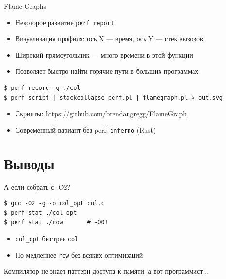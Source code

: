 \documentclass[aspectratio=169, russian]{beamer}
\begin{document}
\begin{frame}[fragile]{Flame Graphs}
    \begin{itemize}
        \item Некоторое развитие \texttt{perf report}
        \item Визуализация профиля: ось X --- время, ось Y --- стек вызовов
        \item Широкий прямоугольник --- много времени в этой функции
        \item Позволяет быстро найти горячие пути в больших программах
    \end{itemize}

    \bigskip
    \begin{verbatim}
$ perf record -g ./col
$ perf script | stackcollapse-perf.pl | flamegraph.pl > out.svg
\end{verbatim}

    \bigskip
    \begin{itemize}
        \item Скрипты: \url{https://github.com/brendangregg/FlameGraph}
        \item Современный вариант без perl: \texttt{inferno} (Rust)
    \end{itemize}
\end{frame}

\section{Выводы}

\begin{frame}[fragile]{А если собрать с -O2?}
    \begin{verbatim}
$ gcc -O2 -g -o col_opt col.c
$ perf stat ./col_opt
$ perf stat ./row       # -O0!
\end{verbatim}

    \bigskip
    \begin{itemize}
        \item \texttt{col\_opt} быстрее \texttt{col}
        \item Но медленнее \texttt{row} без всяких оптимизаций
    \end{itemize}

    \bigskip

    Компилятор не знает паттерн доступа к памяти, а вот программист...

\end{frame}
\end{document}
